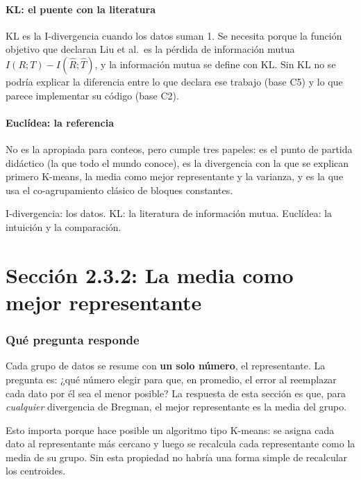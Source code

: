 \documentclass[11pt,a4paper]{article}
\newenvironment{idea}{\par\begin{center}\begin{lrbox}{\ideabox}\begin{minipage}{0.9\linewidth}}{\end{minipage}\end{lrbox}\fcolorbox{blue!40!black}{blue!5}{\usebox{\ideabox}}\end{center}}
\begin{document}
\subsection{KL: el puente con la literatura}

KL es la I-divergencia cuando los datos suman 1. Se necesita porque la función
objetivo que declaran Liu et al.\ es la pérdida de información mutua
$I(R;T)-I(\hat R;\hat T)$, y la información mutua se define con KL. Sin KL no se
podría explicar la diferencia entre lo que declara ese trabajo (base C5) y lo que
parece implementar su código (base C2).

\subsection{Euclídea: la referencia}

No es la apropiada para conteos, pero cumple tres papeles: es el punto de partida
didáctico (la que todo el mundo conoce), es la divergencia con la que se explican
primero K-means, la media como mejor representante y la varianza, y es la que usa
el co-agrupamiento clásico de bloques constantes.

\begin{idea}
I-divergencia: los datos. KL: la literatura de información mutua. Euclídea: la
intuición y la comparación.
\end{idea}

\part{Sección 2.3.2: La media como mejor representante}

\section{Qué pregunta responde}

Cada grupo de datos se resume con \textbf{un solo número}, el representante. La
pregunta es: ¿qué número elegir para que, en promedio, el error al reemplazar cada
dato por él sea el menor posible? La respuesta de esta sección es que, para
\emph{cualquier} divergencia de Bregman, el mejor representante es la media del
grupo.

Esto importa porque hace posible un algoritmo tipo K-means: se asigna cada dato al
representante más cercano y luego se recalcula cada representante como la media de
su grupo. Sin esta propiedad no habría una forma simple de recalcular los
centroides.
\end{document}
